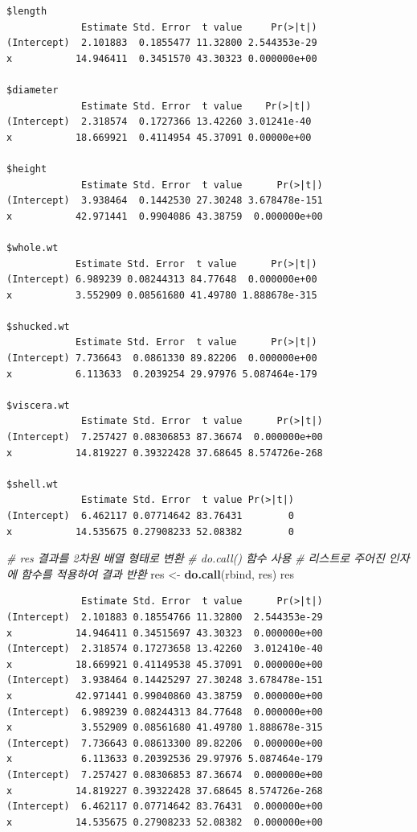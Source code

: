 \documentclass[
  11pt,
]{krantz}
\newenvironment{Shaded}{\begin{snugshade}}{\end{snugshade}}
\newcommand{\CommentTok}[1]{\textcolor[rgb]{0.37,0.37,0.37}{\textit{#1}}}
\newcommand{\KeywordTok}[1]{\textcolor[rgb]{0.27,0.27,0.27}{\textbf{#1}}}
\newcommand{\NormalTok}[1]{#1}
\newcommand{\StringTok}[1]{\textcolor[rgb]{0.5,0.5,0.5}{#1}}
\begin{document}
\begin{verbatim}
$length
             Estimate Std. Error  t value     Pr(>|t|)
(Intercept)  2.101883  0.1855477 11.32800 2.544353e-29
x           14.946411  0.3451570 43.30323 0.000000e+00

$diameter
             Estimate Std. Error  t value    Pr(>|t|)
(Intercept)  2.318574  0.1727366 13.42260 3.01241e-40
x           18.669921  0.4114954 45.37091 0.00000e+00

$height
             Estimate Std. Error  t value      Pr(>|t|)
(Intercept)  3.938464  0.1442530 27.30248 3.678478e-151
x           42.971441  0.9904086 43.38759  0.000000e+00

$whole.wt
            Estimate Std. Error  t value      Pr(>|t|)
(Intercept) 6.989239 0.08244313 84.77648  0.000000e+00
x           3.552909 0.08561680 41.49780 1.888678e-315

$shucked.wt
            Estimate Std. Error  t value      Pr(>|t|)
(Intercept) 7.736643  0.0861330 89.82206  0.000000e+00
x           6.113633  0.2039254 29.97976 5.087464e-179

$viscera.wt
             Estimate Std. Error  t value      Pr(>|t|)
(Intercept)  7.257427 0.08306853 87.36674  0.000000e+00
x           14.819227 0.39322428 37.68645 8.574726e-268

$shell.wt
             Estimate Std. Error  t value Pr(>|t|)
(Intercept)  6.462117 0.07714642 83.76431        0
x           14.535675 0.27908233 52.08382        0
\end{verbatim}

\begin{Shaded}
\begin{Highlighting}[]
\CommentTok{# res 결과를 2차원 배열 형태로 변환}
\CommentTok{# do.call() 함수 사용}
\CommentTok{# 리스트로 주어진 인자에 함수를 적용하여 결과 반환}
\NormalTok{res <-}\StringTok{ }\KeywordTok{do.call}\NormalTok{(rbind, res)  }
\NormalTok{res}
\end{Highlighting}
\end{Shaded}

\begin{verbatim}
             Estimate Std. Error  t value      Pr(>|t|)
(Intercept)  2.101883 0.18554766 11.32800  2.544353e-29
x           14.946411 0.34515697 43.30323  0.000000e+00
(Intercept)  2.318574 0.17273658 13.42260  3.012410e-40
x           18.669921 0.41149538 45.37091  0.000000e+00
(Intercept)  3.938464 0.14425297 27.30248 3.678478e-151
x           42.971441 0.99040860 43.38759  0.000000e+00
(Intercept)  6.989239 0.08244313 84.77648  0.000000e+00
x            3.552909 0.08561680 41.49780 1.888678e-315
(Intercept)  7.736643 0.08613300 89.82206  0.000000e+00
x            6.113633 0.20392536 29.97976 5.087464e-179
(Intercept)  7.257427 0.08306853 87.36674  0.000000e+00
x           14.819227 0.39322428 37.68645 8.574726e-268
(Intercept)  6.462117 0.07714642 83.76431  0.000000e+00
x           14.535675 0.27908233 52.08382  0.000000e+00
\end{verbatim}
\end{document}
